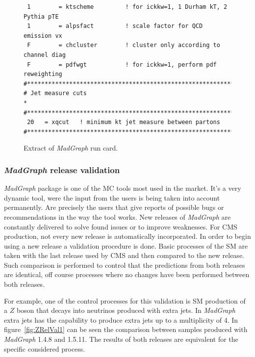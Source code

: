 \begin{itemize}
\begin{itemize}
\begin{figure}[!Hhtbp]
\begin{center}
\begin{minipage}[c]{0.7\textwidth}
\begin{verbatim}
 1        = ktscheme         ! for ickkw=1, 1 Durham kT, 2 Pythia pTE
 1        = alpsfact         ! scale factor for QCD emission vx
 F        = chcluster        ! cluster only according to channel diag
 F        = pdfwgt           ! for ickkw=1, perform pdf reweighting
#*********************************************************************
# Jet measure cuts                                                   *
#*********************************************************************
 20   = xqcut   ! minimum kt jet measure between partons
#*********************************************************************
\end{verbatim}
\normalsize
        \end{minipage}
          \caption{Extract of \textit{MadGraph} run card.}
          \label{fig:RunCard}
      \end{center}
    \end{figure}

  \end{itemize}
\end{itemize}


\subsubsection{\textit{MadGraph} release validation}

\textit{MadGraph} package is one of the MC tools most used in the market. It's a very dynamic tool, were the input from the users is being taken into account permanently. Are precisely the users that give reports of possible bugs or recommendations in the way the tool works. New releases of \textit{MadGraph} are constantly delivered to solve found issues or to improve weaknesses. For CMS production, not every new release is automatically incorporated. In order to begin using a new release a validation procedure is done. Basic processes of the SM are taken with the last release used by CMS and then compared to the new release. Such comparison is performed to control that the predictions from both releases are identical, off course processes where no changes have been performed between both releases. 

For example, one of the control processes for this validation is SM production of a $Z$ boson that decays into neutrinos produced with extra jets. In \textit{MadGraph} extra jets has the capability to produce extra jets up to a multiplicity of 4. In figure~\ref{fig:ZRelVal1} can be seen the comparison between samples produced with \textit{MadGraph} 1.4.8 and 1.5.11. The results of both releases are equivalent for the specific considered process.

